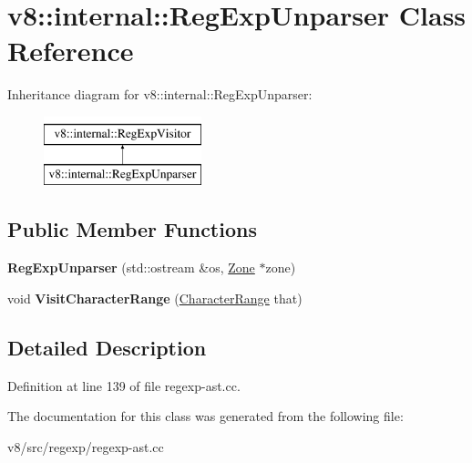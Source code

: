 \hypertarget{classv8_1_1internal_1_1RegExpUnparser}{}\section{v8\+:\+:internal\+:\+:Reg\+Exp\+Unparser Class Reference}
\label{classv8_1_1internal_1_1RegExpUnparser}
Inheritance diagram for v8\+:\+:internal\+:\+:Reg\+Exp\+Unparser\+:\begin{figure}[H]
\begin{center}
\leavevmode
\includegraphics[height=2.000000cm]{classv8_1_1internal_1_1RegExpUnparser}
\end{center}
\end{figure}
\subsection*{Public Member Functions}
\begin{DoxyCompactItemize}
\item 
\mbox{\label{classv8_1_1internal_1_1RegExpUnparser_a173b4c3a192299699a7b990d77331078}} 
{\bfseries Reg\+Exp\+Unparser} (std\+::ostream \&os, \mbox{\hyperlink{classv8_1_1internal_1_1Zone}{Zone}} $\ast$zone)
\item 
\mbox{\label{classv8_1_1internal_1_1RegExpUnparser_a96347cb8b81686a264858d55566f6244}} 
void {\bfseries Visit\+Character\+Range} (\mbox{\hyperlink{classv8_1_1internal_1_1CharacterRange}{Character\+Range}} that)
\end{DoxyCompactItemize}


\subsection{Detailed Description}


Definition at line 139 of file regexp-\/ast.\+cc.



The documentation for this class was generated from the following file\+:\begin{DoxyCompactItemize}
\item 
v8/src/regexp/regexp-\/ast.\+cc\end{DoxyCompactItemize}
